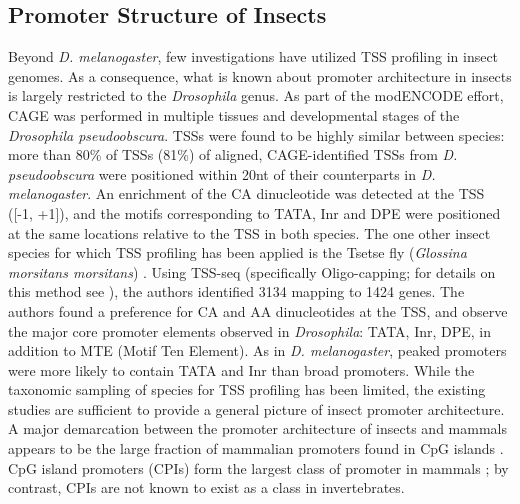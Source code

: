\documentclass[runningheads,a4paper]{llncs}
\begin{document}
\begin{linenumbers}
\subsection{Promoter Structure of Insects}
Beyond \textit{D. melanogaster}, few investigations have utilized TSS profiling in insect genomes. 
As a consequence, what is known about promoter architecture in insects is largely restricted to the \textit{Drosophila} genus. 
As part of the modENCODE effort, CAGE was performed in multiple tissues and developmental stages of the \textit{Drosophila pseudoobscura}. 
TSSs were found to be highly similar between species: more than 80\% of TSSs (81\%) of aligned, CAGE-identified TSSs from \textit{D. pseudoobscura} were positioned within 20nt of their counterparts in \textit{D. melanogaster}.
An enrichment of the CA dinucleotide was detected at the TSS ([-1, +1]), and the motifs corresponding to TATA, Inr and DPE were positioned at the same locations relative to the TSS in both species.
The one other insect species for which TSS profiling has been applied is the Tsetse fly (\textit{Glossina morsitans morsitans}) \cite{Mwangi:2015kn}. 
Using TSS-seq (specifically Oligo-capping; for details on this method see \cite{Tsuchihara:2009dm}), the authors identified 3134 mapping to 1424 genes. 
The authors found a preference for CA and AA dinucleotides at the TSS, and observe the major core promoter elements observed in \textit{Drosophila}: TATA, Inr, DPE, in addition to MTE (Motif Ten Element).
As in \textit{D. melanogaster}, peaked promoters were more likely to contain TATA and Inr than broad promoters. 
While the taxonomic sampling of species for TSS profiling has been limited, the existing studies are sufficient to provide a general picture of insect promoter architecture.
A major demarcation between the promoter architecture of insects and mammals appears to be the large fraction of mammalian promoters found in CpG islands \cite{Mwangi:2015kn}.
CpG island promoters (CPIs) form the largest class of promoter in mammals \cite{Cvetesic:2017hl}; by contrast, CPIs are not known to exist as a class in invertebrates.



\end{linenumbers}
\end{document}
